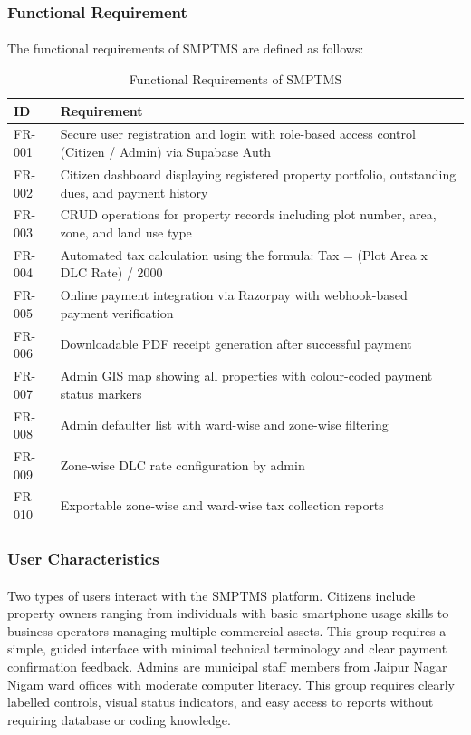 \subsubsection{Functional Requirement}
\paragraph{}The functional requirements of SMPTMS are defined as follows:
\begin{table}[H]
\begin{center}
\begin{tabular}{| m{2cm} | m{11cm} |}
\hline
\textbf{ID} & \textbf{Requirement} \\
\hline
FR-001 & Secure user registration and login with role-based access control (Citizen / Admin) via Supabase Auth \\
\hline
FR-002 & Citizen dashboard displaying registered property portfolio, outstanding dues, and payment history \\
\hline
FR-003 & CRUD operations for property records including plot number, area, zone, and land use type \\
\hline
FR-004 & Automated tax calculation using the formula: Tax = (Plot Area x DLC Rate) / 2000 \\
\hline
FR-005 & Online payment integration via Razorpay with webhook-based payment verification \\
\hline
FR-006 & Downloadable PDF receipt generation after successful payment \\
\hline
FR-007 & Admin GIS map showing all properties with colour-coded payment status markers \\
\hline
FR-008 & Admin defaulter list with ward-wise and zone-wise filtering \\
\hline
FR-009 & Zone-wise DLC rate configuration by admin \\
\hline
FR-010 & Exportable zone-wise and ward-wise tax collection reports \\
\hline
\end{tabular}
\caption{Functional Requirements of SMPTMS}
\end{center}
\end{table}

\subsubsection{User Characteristics}
\paragraph{}Two types of users interact with the SMPTMS platform. Citizens include property owners ranging from individuals with basic smartphone usage skills to business operators managing multiple commercial assets. This group requires a simple, guided interface with minimal technical terminology and clear payment confirmation feedback. Admins are municipal staff members from Jaipur Nagar Nigam ward offices with moderate computer literacy. This group requires clearly labelled controls, visual status indicators, and easy access to reports without requiring database or coding knowledge.

